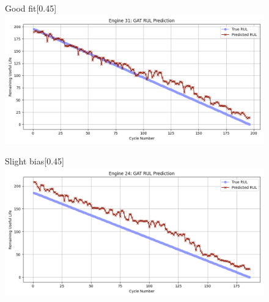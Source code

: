 \documentclass[12pt]{article}
\begin{document}
\begin{figure}[H]
    \centering

    \begin{subcaptionbox}{Good fit\label{fig_NASA_GAT_eng6}}[0.45\textwidth]
        {\includegraphics[width=\linewidth]{figures/NASA/NASA_GAT_eng7.png}}
    \end{subcaptionbox}
    \hfill
    \begin{subcaptionbox}{Slight bias\label{fig_NASA_GAT_eng4}}[0.45\textwidth]
        {\includegraphics[width=\linewidth]{figures/NASA/NASA_GAT_eng6.png}}
    \end{subcaptionbox}

    \vspace{0.5cm}


\end{figure}
\end{document}
